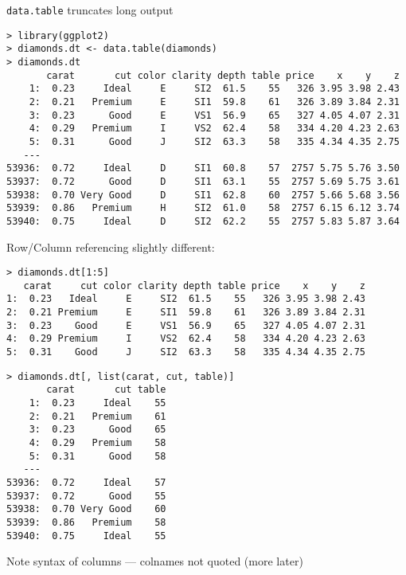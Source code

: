 \documentclass[12pt]{beamer}
\begin{document}
\begin{frame}[fragile]

\texttt{data.table} truncates long output

\pause
\begin{verbatim}
> library(ggplot2)
> diamonds.dt <- data.table(diamonds)
> diamonds.dt
       carat       cut color clarity depth table price    x    y    z
    1:  0.23     Ideal     E     SI2  61.5    55   326 3.95 3.98 2.43
    2:  0.21   Premium     E     SI1  59.8    61   326 3.89 3.84 2.31
    3:  0.23      Good     E     VS1  56.9    65   327 4.05 4.07 2.31
    4:  0.29   Premium     I     VS2  62.4    58   334 4.20 4.23 2.63
    5:  0.31      Good     J     SI2  63.3    58   335 4.34 4.35 2.75
   ---
53936:  0.72     Ideal     D     SI1  60.8    57  2757 5.75 5.76 3.50
53937:  0.72      Good     D     SI1  63.1    55  2757 5.69 5.75 3.61
53938:  0.70 Very Good     D     SI1  62.8    60  2757 5.66 5.68 3.56
53939:  0.86   Premium     H     SI2  61.0    58  2757 6.15 6.12 3.74
53940:  0.75     Ideal     D     SI2  62.2    55  2757 5.83 5.87 3.64
\end{verbatim}

\end{frame}


\begin{frame}[fragile]
Row/Column referencing slightly different:

\pause
\begin{verbatim}
> diamonds.dt[1:5]
   carat     cut color clarity depth table price    x    y    z
1:  0.23   Ideal     E     SI2  61.5    55   326 3.95 3.98 2.43
2:  0.21 Premium     E     SI1  59.8    61   326 3.89 3.84 2.31
3:  0.23    Good     E     VS1  56.9    65   327 4.05 4.07 2.31
4:  0.29 Premium     I     VS2  62.4    58   334 4.20 4.23 2.63
5:  0.31    Good     J     SI2  63.3    58   335 4.34 4.35 2.75
\end{verbatim}

\begin{verbatim}
> diamonds.dt[, list(carat, cut, table)]
       carat       cut table
    1:  0.23     Ideal    55
    2:  0.21   Premium    61
    3:  0.23      Good    65
    4:  0.29   Premium    58
    5:  0.31      Good    58
   ---
53936:  0.72     Ideal    57
53937:  0.72      Good    55
53938:  0.70 Very Good    60
53939:  0.86   Premium    58
53940:  0.75     Ideal    55
\end{verbatim}

\pause
Note syntax of columns --- colnames not quoted (more later)

\end{frame}
\end{document}
